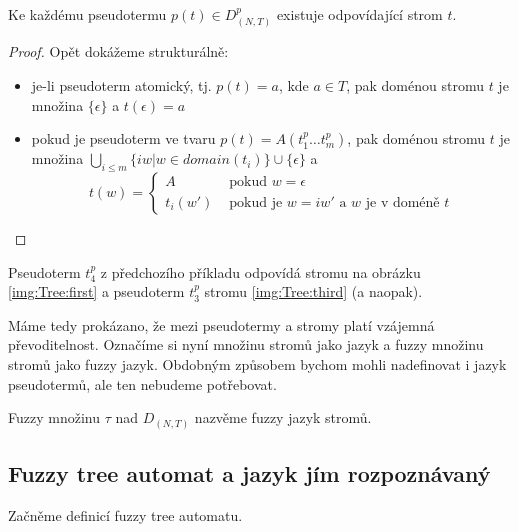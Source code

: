 \documentclass[a4paper,10pt]{article}
\begin{document}
\begin{theorem}
 Ke každému pseudotermu $p(t) \in D_{(N,T)}^p$ existuje odpovídající strom $t$.
\end{theorem}
\begin{proof}
 Opět dokážeme strukturálně:
 \begin{itemize}
  \item je-li pseudoterm atomický, tj. $p(t) = a$, kde $a \in T$, pak doménou stromu $t$ je množina $\{ \epsilon \}$ a $t(\epsilon) = a$
  \item pokud je pseudoterm ve tvaru $p(t) = A(t_1^p \dots t_m^p)$, pak doménou stromu $t$ je množina $\bigcup_{i \leq m} \{ i w | w \in domain(t_i) \} \cup \{ \epsilon \}$ a 
  $$
   t(w) = 
   \begin{cases}
    A		& \text{ pokud $w = \epsilon$}	\\
    t_i(w')	& \text{ pokud je $w = i w'$ a $w$ je v doméně $t$}
   \end{cases}
  $$
 \end{itemize}
\end{proof}

\begin{example} 
 Pseudoterm $t^p_4$ z předchozího příkladu odpovídá stromu na obrázku \ref{img:Tree:first} a pseudoterm $t^p_3$ stromu \ref{img:Tree:third} (a naopak).
\end{example}

Máme tedy prokázano, že mezi pseudotermy a stromy platí vzájemná převoditelnost. Označíme si nyní množinu stromů jako jazyk a fuzzy množinu stromů jako fuzzy jazyk. Obdobným způsobem bychom mohli nadefinovat i jazyk pseudotermů, ale ten nebudeme potřebovat.

\begin{definition}
 Fuzzy množinu $\tau$ nad $D_{(N,T)}$ nazvěme fuzzy jazyk stromů.
\end{definition}


\subsection{Fuzzy tree automat a jazyk jím rozpoznávaný}
Začněme definicí fuzzy tree automatu.
\end{document}
